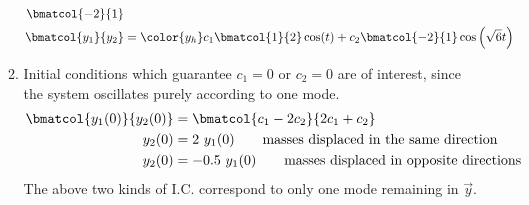\begin{enumerate}
\begin{enumerate}
\begin{align}
                        \bmatcol{-2}{1}                                           \\
                        \bmatcol{y_1}{y_2}                                  &
                        = \color{y_h} c_1 \bmatcol{1}{2}\cos(t)
                        + c_2 \bmatcol{-2}{1}\cos\left( \sqrt{6}t \right)
                    \end{align}
              \item Initial conditions which guarantee $ c_1 = 0 $ or $ c_2  = 0$ are
                    of interest, since the system oscillates purely according to one mode.
                    \begin{align}
                        \bmatcol{y_1(0)}{y_2(0)} & = \bmatcol{c_1 - 2c_2}{2c_1 + c_2} \\
                        y_2(0)                   & = 2\ y_1(0) \qquad
                        \text{masses displaced in the same direction}                 \\
                        y_2(0)                   & = -0.5\ y_1(0) \qquad
                        \text{masses displaced in opposite directions}
                    \end{align}
                    The above two kinds of I.C. correspond to only one mode remaining
                    in $ \vec{y} $.
          \end{enumerate}


\end{enumerate}
